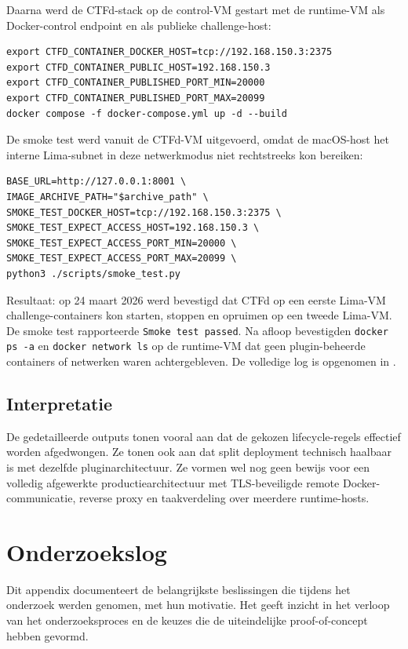 \documentclass[dutch,dit,thesis]{hogentreport}
\begin{document}
Daarna werd de CTFd-stack op de control-VM gestart met de runtime-VM als Docker-control endpoint en als publieke challenge-host:

\begin{verbatim}
export CTFD_CONTAINER_DOCKER_HOST=tcp://192.168.150.3:2375
export CTFD_CONTAINER_PUBLIC_HOST=192.168.150.3
export CTFD_CONTAINER_PUBLISHED_PORT_MIN=20000
export CTFD_CONTAINER_PUBLISHED_PORT_MAX=20099
docker compose -f docker-compose.yml up -d --build
\end{verbatim}

De smoke test werd vanuit de CTFd-VM uitgevoerd, omdat de macOS-host het interne Lima-subnet in deze netwerkmodus niet rechtstreeks kon bereiken:

\begin{verbatim}
BASE_URL=http://127.0.0.1:8001 \
IMAGE_ARCHIVE_PATH="$archive_path" \
SMOKE_TEST_DOCKER_HOST=tcp://192.168.150.3:2375 \
SMOKE_TEST_EXPECT_ACCESS_HOST=192.168.150.3 \
SMOKE_TEST_EXPECT_ACCESS_PORT_MIN=20000 \
SMOKE_TEST_EXPECT_ACCESS_PORT_MAX=20099 \
python3 ./scripts/smoke_test.py
\end{verbatim}

Resultaat: op 24 maart 2026 werd bevestigd dat CTFd op een eerste Lima-VM challenge-containers kon starten, stoppen en opruimen op een tweede Lima-VM. De smoke test rapporteerde \texttt{Smoke test passed}. Na afloop bevestigden \texttt{docker ps -a} en \texttt{docker network ls} op de runtime-VM dat geen plugin-beheerde containers of netwerken waren achtergebleven. De volledige log is opgenomen in .

\section*{Interpretatie}

De gedetailleerde outputs tonen vooral aan dat de gekozen lifecycle-regels effectief worden afgedwongen. Ze tonen ook aan dat split deployment technisch haalbaar is met dezelfde pluginarchitectuur. Ze vormen wel nog geen bewijs voor een volledig afgewerkte productiearchitectuur met TLS-beveiligde remote Docker-communicatie, reverse proxy en taakverdeling over meerdere runtime-hosts.

\chapter{Onderzoekslog}
\label{app:onderzoekslog}

Dit appendix documenteert de belangrijkste beslissingen die tijdens het onderzoek werden genomen, met hun motivatie. Het geeft inzicht in het verloop van het onderzoeksproces en de keuzes die de uiteindelijke proof-of-concept hebben gevormd.
\end{document}
